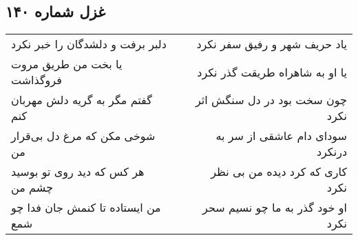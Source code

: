\begin{center}
\section*{غزل شماره ۱۴۰}
\label{sec:sh140}
\begin{longtable}{l p{0.5cm} r}
دلبر برفت و دلشدگان را خبر نکرد
&&
یاد حریف شهر و رفیق سفر نکرد
\\
یا بخت من طریق مروت فروگذاشت
&&
یا او به شاهراه طریقت گذر نکرد
\\
گفتم مگر به گریه دلش مهربان کنم
&&
چون سخت بود در دل سنگش اثر نکرد
\\
شوخی مکن که مرغ دل بی‌قرار من
&&
سودای دام عاشقی از سر به درنکرد
\\
هر کس که دید روی تو بوسید چشم من
&&
کاری که کرد دیده من بی نظر نکرد
\\
من ایستاده تا کنمش جان فدا چو شمع
&&
او خود گذر به ما چو نسیم سحر نکرد
\\
\end{longtable}
\end{center}

